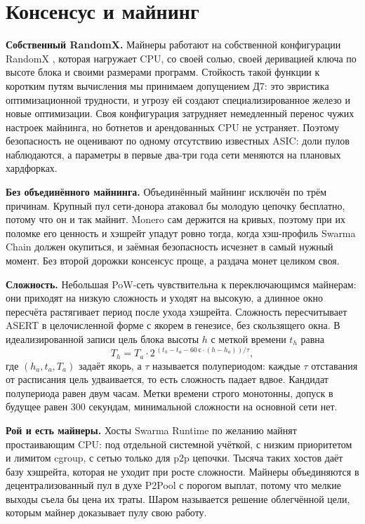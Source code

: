 \documentclass[10pt,a4paper]{article}
\begin{document}
\section{Консенсус и майнинг}
\label{sec:consensus}

\textbf{Собственный RandomX.}
Майнеры работают на собственной конфигурации RandomX \cite{randomx}, которая нагружает CPU, со своей солью, своей деривацией ключа по высоте блока и своими размерами программ.
Стойкость такой функции к коротким путям вычисления мы принимаем допущением Д7: это эвристика оптимизационной трудности, и угрозу ей создают специализированное железо и новые оптимизации.
Своя конфигурация затрудняет немедленный перенос чужих настроек майнинга, но ботнетов и арендованных CPU не устраняет.
Поэтому безопасность не оценивают по одному отсутствию известных ASIC: доли пулов наблюдаются, а параметры в первые два-три года сети меняются на плановых хардфорках.

\textbf{Без объединённого майнинга.}
Объединённый майнинг \cite{mergedmining} исключён по трём причинам.
Крупный пул сети-донора атаковал бы молодую цепочку бесплатно, потому что он и так майнит.
Monero сам держится на кривых, поэтому при их поломке его ценность и хэшрейт упадут ровно тогда, когда хэш-профиль Swarma Chain должен окупиться, и заёмная безопасность исчезнет в самый нужный момент.
Без второй дорожки консенсус проще, а раздача монет целиком своя.

\textbf{Сложность.}
Небольшая PoW-сеть чувствительна к переключающимся майнерам: они приходят на низкую сложность и уходят на высокую, а длинное окно пересчёта растягивает период после ухода хэшрейта.
Сложность пересчитывает ASERT \cite{asert} в целочисленной форме с якорем в генезисе, без скользящего окна.
В идеализированной записи цель блока высоты $h$ с меткой времени $t_h$ равна
\[
T_h = T_a\cdot 2^{\,(t_h - t_a - 60\,\text{с}\cdot(h-h_a))/\tau},
\]
где $(h_a,t_a,T_a)$ задаёт якорь, а $\tau$ называется полупериодом: каждые $\tau$ отставания от расписания цель удваивается, то есть сложность падает вдвое.
Кандидат полупериода равен двум часам.
Метки времени строго монотонны, допуск в будущее равен 300 секундам, минимальной сложности на основной сети нет.

\textbf{Рой и есть майнеры.}
Хосты Swarma Runtime по желанию майнят простаивающим CPU: под отдельной системной учёткой, с низким приоритетом и лимитом cgroup, с сетью только для p2p цепочки.
Тысяча таких хостов даёт базу хэшрейта, которая не уходит при росте сложности.
Майнеры объединяются в децентрализованный пул в духе P2Pool \cite{p2pool} с порогом выплат, потому что мелкие выходы съела бы цена их траты.
Шаром называется решение облегчённой цели, которым майнер доказывает пулу свою работу.
\end{document}
